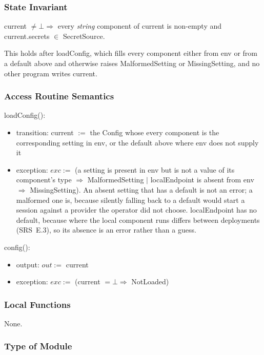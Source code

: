 \documentclass[12pt, titlepage]{article}
\newcommand{\str}{\textit{string}}
\newcommand{\nil}{\bot}
\begin{document}
\subsubsection{State Invariant}

current $\neq \nil \Rightarrow$ every \str{} component of current is non-empty
and current.secrets $\in$ SecretSource.

\noindent This holds after loadConfig, which fills every component either from
env or from a default above and otherwise raises MalformedSetting or
MissingSetting, and no other
program writes current.

\subsubsection{Access Routine Semantics}

\noindent loadConfig():
\begin{itemize}
\item transition: current $:=$ the Config whose every component is the
corresponding setting in env, or the default above where env does not supply it
\item exception: $exc :=$ (a setting is present in env but is not a value of its
component's type $\Rightarrow$ MalformedSetting $|$ localEndpoint is absent from
env $\Rightarrow$ MissingSetting). An absent setting that has a default is not an
error; a malformed one is, because silently falling back to a default would
start a session against a provider the operator did not choose. localEndpoint
has no default, because where the local component runs differs between
deployments (SRS~E.3), so its absence is an error rather than a guess.
\end{itemize}

\noindent config():
\begin{itemize}
\item output: $out :=$ current
\item exception: $exc :=$ (current $= \nil \Rightarrow$ NotLoaded)
\end{itemize}

\subsubsection{Local Functions}

None.

\subsubsection{Type of Module}
\end{document}
